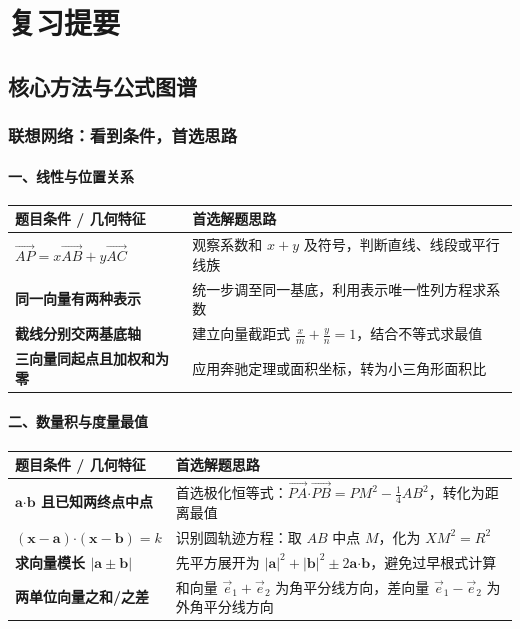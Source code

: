 \documentclass[11pt,a4paper,openany]{ctexbook}
\newcommand{\vect}[1]{\overrightarrow{#1}}
\newcommand{\vv}[1]{\bm{#1}}
\newcommand{\dotp}{\mathbin{\boldsymbol\cdot}}
\begin{document}
\part{复习提要}

\chapter{核心方法与公式图谱}

\section{联想网络：看到条件，首选思路}

\subsection{一、线性与位置关系}
\begin{center}
\begin{tabularx}{0.98\textwidth}{>{\bfseries}p{4.2cm}X}
\toprule
题目条件 / 几何特征 & 首选解题思路\\
\midrule
\(\vect{AP}=x\vect{AB}+y\vect{AC}\) & 观察系数和 \(x+y\) 及符号，判断直线、线段或平行线族\\
同一向量有两种表示 & 统一步调至同一基底，利用表示唯一性列方程求系数\\
截线分别交两基底轴 & 建立向量截距式 \(\frac xm+\frac yn=1\)，结合不等式求最值\\
三向量同起点且加权和为零 & 应用奔驰定理或面积坐标，转为小三角形面积比\\
\bottomrule
\end{tabularx}
\end{center}

\subsection{二、数量积与度量最值}
\begin{center}
\begin{tabularx}{0.98\textwidth}{>{\bfseries}p{4.2cm}X}
\toprule
题目条件 / 几何特征 & 首选解题思路\\
\midrule
\(\vv a\dotp\vv b\) 且已知两终点中点 & 首选极化恒等式：\(\vect{PA}\dotp\vect{PB}=PM^2-\frac14AB^2\)，转化为距离最值\\
\((\vv x-\vv a)\dotp(\vv x-\vv b)=k\) & 识别圆轨迹方程：取 \(AB\) 中点 \(M\)，化为 \(XM^2 = R^2\)\\
求向量模长 \(|\vv a\pm\vv b|\) & 先平方展开为 \(|\vv a|^2+|\vv b|^2\pm 2\vv a\dotp\vv b\)，避免过早根式计算\\
两单位向量之和/之差 & 和向量 \(\vec e_1+\vec e_2\) 为角平分线方向，差向量 \(\vec e_1-\vec e_2\) 为外角平分线方向\\
\bottomrule
\end{tabularx}
\end{center}
\end{document}
